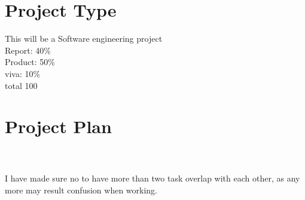 \section{Project Type}
This will be a Software engineering project
\\Report:  40\% 
\\Product: 50\% 
\\viva:    10\% 
\\total    100%
\section{Project Plan}

\noindent
{}
{}
\\\\
I have made sure no to have  more than two task overlap with each other, as any more may result confusion when working.




